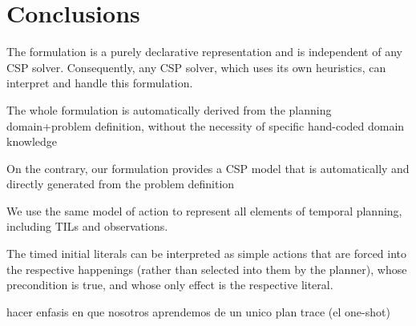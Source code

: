 \documentclass[runningheads]{llncs}
\begin{document}
\section{Conclusions}
\label{sec:conclusions}


The formulation is a purely declarative representation and is independent of
any CSP solver. Consequently, any CSP solver, which uses its own heuristics, can interpret and handle this
formulation.


The whole formulation is automatically derived from the planning
domain+problem definition, without the necessity of specific
hand-coded domain knowledge


On the contrary, our formulation provides a CSP
model that is automatically and directly generated from the problem
definition



We use the same model of action to represent all elements of temporal planning, including TILs and observations.

The timed initial literals can be interpreted as simple actions that are forced into the respective happenings (rather than selected into them by the planner), whose precondition is true, and whose only effect is the respective literal.

hacer enfasis en que nosotros aprendemos de un unico plan trace (el one-shot)

%
%
%


%
\end{document}

